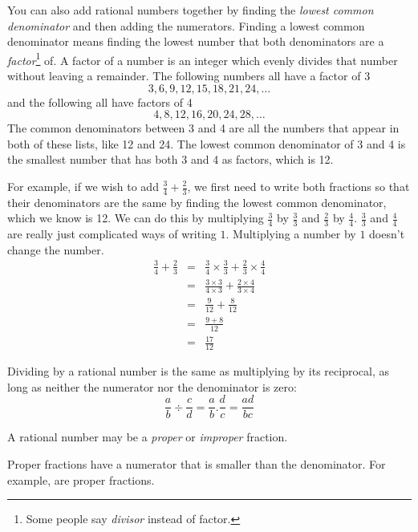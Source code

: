 \documentclass[10pt,a4paper,titlepage,twoside,openright]{report}
\begin{document}
You can also add rational numbers together by finding the \textit{lowest common denominator} and then adding the numerators. Finding a lowest common
denominator means finding the lowest number that both denominators are a
\textit{factor}\footnote{Some people say \textit{divisor} instead of factor.}
of. A factor of a number is an integer which evenly divides that number without
leaving a remainder. The following numbers all have a factor of 3
\begin{equation*}
3, 6, 9, 12, 15, 18, 21, 24,\ldots
\end{equation*}
and the following all have factors of 4
\begin{equation*}
4, 8, 12, 16, 20, 24, 28,\ldots
\end{equation*}
The common denominators between 3 and 4 are all the numbers that appear in both of these lists, like 12 and 24. The lowest common denominator of 3 and 4 is the smallest number that has both 3 and 4 as factors, which is 12.

For example, if we wish to add $\frac{3}{4} + \frac{2}{3}$, we first need to write both fractions so that their denominators are the same by finding the lowest common denominator, which we know is 12. We can do this by multiplying $\frac{3}{4}$ by $\frac{3}{3}$ and $\frac{2}{3}$ by $\frac{4}{4}$. $\frac{3}{3}$ and $\frac{4}{4}$ are really just complicated ways of writing $1$. Multiplying a number by $1$ doesn't change the number.
\begin{eqnarray}
\label{eq:mfoundation:r:lcd}
\frac 34 + \frac 23
&=&\frac 34\times\frac 33 + \frac 23\times\frac 44 \\ \nonumber
&=&\frac{3\times 3}{4\times 3} + \frac{2\times 4}{3\times 4} \\ \nonumber
&=&\frac 9{12} + \frac 8{12} \\ \nonumber
&=&\frac{9+8}{12} \\ \nonumber
&=&\frac{17}{12}
\end{eqnarray}

Dividing by a rational number is the same as multiplying by its reciprocal, as long as neither the numerator nor the denominator is zero:
\begin{equation}
\label{eq:mfoundation:r:div}
\frac ab \div \frac cd = \frac ab .\frac dc = \frac{ad}{bc}
\end{equation}

A rational number may be a \textit{proper} or \textit{improper} fraction. 

Proper fractions have a numerator that is smaller than the denominator. For example, 
 are proper fractions.
\end{document}
